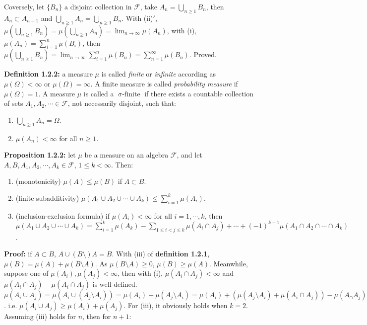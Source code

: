 \documentclass{article}
\newcommand{\mc}{\mathcal}
\DeclareMathOperator{\sifin}{\sigma-finite}
\begin{document}
\vspace{1mm}
Coversely, let \(\{B_n\}\) a disjoint collection in \(\mc{F}\), take \(A_n=\bigcup_{n\geq 1} B_{n}\), then
\(A_n \subset A_{n+1}\) and
\(\bigcup_{n\geq 1}A_n=\bigcup_{n\geq 1}B_n\). With (ii)\('\), \(\mu(\bigcup_{n\geq 1}B_n)=\mu(\bigcup_{n\geq 1}A_n)
=\lim_{n\to\infty}\mu(A_n)\), with (i), \(\mu(A_n)=\sum_{i=1}^n\mu(B_i)\), then \(\mu(\bigcup_{n\geq 1}B_n)
=\lim_{n\to\infty}\sum_{i=1}^n\mu(B_n)=\sum_{n=1}^{\infty}\mu(B_n)\). Proved.

\vspace{2mm}
\textbf{Definition 1.2.2: } a measure \(\mu\) is called \textit{finite} or \textit{infinite} according as 
\(\mu(\Omega)<\infty\) or \(\mu(\Omega)=\infty\). A finite measure is called \textit{probability measure} if
\(\mu(\Omega)=1\). A measure \(\mu\) is called a \(\sifin\) if there exists a countable collection of sets
\(A_1, A_2, \cdots \in \mc{F}\), not necessarily disjoint, such that:

\begin{enumerate}[label=(\alph*)]
\item \(\bigcup_{n\geq 1}A_n=\Omega\).
\item \(\mu(A_n)<\infty\) for all \(n\geq 1\).
\end{enumerate}

\vspace{2mm}
\textbf{Proposition 1.2.2: } let \(\mu\) be a measure on an algebra \(\mc{F}\), and let \(A, B, A_1, A_2, \cdots, A_k\in \mc{F}\),
\(1\leq k < \infty\). Then:

\begin{enumerate}[label=(\roman*)]
\item (monotonicity) \(\mu(A)\leq\mu(B)\) if \(A\subset B\).
\item (finite subadditivity) \(\mu(A_1\cup A_2\cup \cdots\cup A_k )
\leq \sum_{i=1}^k\mu(A_i)\).
\item (inclusion-exclusion formula) if \(\mu(A_i)<\infty\) for all \(i=1,\cdots, k\), then
\(\mu(A_1\cup A_2\cup \cdots\cup A_k)=\sum_{i=1}^k\mu(A_k)-\sum_{1\leq i < j \leq k}
\mu(A_i\cap A_j)+\cdots+(-1)^{k-1}\mu(A_1\cap A_2\cap\cdots\cap A_k)\).
\end{enumerate}

\vspace{2mm}
\textbf{Proof: } if \(A\subset B\), \(A\cup (B\setminus) A = B\). With (iii) of \textbf{definition 1.2.1},
\(\mu(B)=\mu(A) + \mu(B\setminus A)\). As \(\mu(B\setminus A)\geq 0\),
\(\mu(B)\geq \mu(A)\). Meanwhile, suppose one of \(\mu(A_i), \mu(A_j) < \infty\),
then with (i), \(\mu(A_i\cap A_j)<\infty\) and \(\mu(A_i\cap A_j)-\mu(A_i\cap A_j)\)
is well defined. 
\(\mu(A_i\cup A_j)=\mu(A_i\cup (A_j\setminus A_i))=\mu(A_i)+\mu(A_j\setminus A_i)
=\mu(A_i)+(\mu(A_j\setminus A_i) + \mu(A_i\cap A_j)) - \mu(A_\cap A_j)=\mu(A_i)+\mu(A_j)-\mu(A_i\cap A_j)\).
i.e. \(\mu(A_i\cup A_j)\geq \mu(A_i)+\mu(A_j)\).
For (iii), it obviously holds when \(k=2\). Assuming (iii) holds for \(n\), then for \(n+1\):
\end{document}

